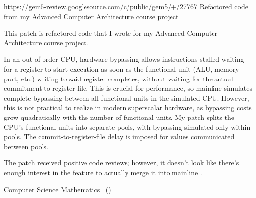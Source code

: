 \fi
\filbreak

\ifdefined\RESUME
{}%
{https://gem5-review.googlesource.com/c/public/gem5/+/27767}%
{Refactored  code from my Advanced Computer Architecture
course project}
\fi
\ifdefined\CV
{}

This patch is refactored  code that I wrote for my
Advanced Computer Architecture course project.

In an out-of-order CPU, hardware bypassing allows instructions stalled
waiting for a register to start execution as soon as the functional
unit (ALU, memory port, etc.) writing to said register completes,
without waiting for the actual commitment to register file. This is
crucial for performance, so mainline  simulates complete
bypassing between all functional units in the simulated CPU. However,
this is not practical to realize in modern superscalar hardware, as
bypassing costs grow quadratically with the number of functional
units. My patch splits the CPU's functional units into separate pools,
with bypassing simulated only within pools. The
commit-to-register-file delay is imposed for values communicated
between pools.

The patch received positive code reviews; however, it doesn't look
like there's enough interest in the feature to actually merge it into
mainline .


\fi
\filbreak

\ifdefined\CV
\newpage
{}

 Computer Science \hfill{}
Mathematics \hfill{} \GPA\ (\GpaDate)


